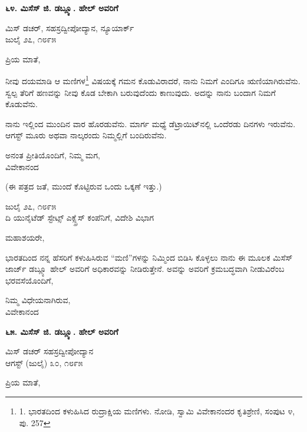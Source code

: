 \begin{center}
\textbf{೬೪. ಮಿಸೆಸ್ ಜಿ. ಡಬ್ಲ್ಯೂ. ಹೇಲ್ ಅವರಿಗೆ}
\end{center}

\begin{flushright}
 ಮಿಸ್ ಡಚರ್, ಸಹಸ್ರದ್ವೀಪೋದ್ಯಾನ, ನ್ಯೂಯಾರ್ಕ್\\ಜುಲೈ ೨೭, ೧೮೯೫
\end{flushright}

ಪ್ರಿಯ ಮಾತೆ,

ನೀವು ದಯಮಾಡಿ ಆ ಮಣಿಗಳ\footnote{1. ಭಾರತದಿಂದ ಕಳುಹಿಸಿದ ರುದ್ರಾಕ್ಷಿಯ ಮಣಿಗಳು. ನೋಡಿ, ಸ್ವಾಮಿ ವಿವೇಕಾನಂದರ ಕೃತಿಶ್ರೇಣಿ, ಸಂಪುಟ ೪, ಪು. 257} ವಿಷಯಕ್ಕೆ ಗಮನ ಕೊಡುವಿರಾದರೆ, ನಾನು ನಿಮಗೆ ಎಂದಿಗೂ ಋಣಿಯಾಗಿರುವೆನು. ಸ್ವಲ್ಪ ತೆರಿಗೆ ಹಣವನ್ನು ನೀವು ಕೊಡ ಬೇಕಾಗಿ ಬರುವುದೆಂದು ಕಾಣುವುದು. ಅದನ್ನು ನಾನು ಬಂದಾಗ ನಿಮಗೆ ಕೊಡುವೆನು.

ನಾನು ಇಲ್ಲಿಂದ ಮುಂದಿನ ವಾರ ಹೊರಡುವೆನು. ಮಾರ್ಗ ಮಧ್ಯೆ ಡೆಟ್ರಾಯಿಟ್‌ನಲ್ಲಿ ಒಂದೆರಡು ದಿನಗಳು ಇರುವೆನು. ಆಗಸ್ಟ್ ಮೂರು ಅಥವಾ ನಾಲ್ಕರಂದು ನಿಮ್ಮಲ್ಲಿಗೆ ಬಂದಿರುವೆನು.

\begin{flushright}
ಅನಂತ ಪ್ರೀತಿಯೊಂದಿಗೆ, ನಿಮ್ಮ ಮಗ,\\ವಿವೇಕಾನಂದ
\end{flushright}

(ಈ ಪತ್ರದ ಜತೆ, ಮುಂದೆ ಕೊಟ್ಟಿರುವ ಒಂದು ಒಕ್ಕಣೆ ಇತ್ತು.)

\begin{flushright}
ಜುಲೈ ೨೭, ೧೮೯೫\\ದಿ ಯುನೈಟೆಡ್ ಸ್ಟೇಟ್ಸ್ ಎಕ್ಸ್ಪ್ರೆಸ್ ಕಂಪೆನಿಗೆ, ವಿದೇಶಿ ವಿಭಾಗ
\end{flushright}

ಮಹಾಶಯರೇ,

ಭಾರತದಿಂದ ನನ್ನ ಹೆಸರಿಗೆ ಕಳುಹಿಸಿರುವ “ಮಣಿ”ಗಳನ್ನು ನಿಮ್ಮಿಂದ ಬಿಡಿಸಿ ಕೊಳ್ಳಲು ನಾನು ಈ ಮೂಲಕ ಮಿಸೆಸ್ ಜಾರ್ಜ್ ಡಬ್ಲ್ಯೂ ಹೇಲ್ ಅವರಿಗೆ ಅಧಿಕಾರವನ್ನು ನೀಡಿರುತ್ತೇನೆ. ಅವನ್ನು ಅವರಿಗೆ ಕ್ರಮಬದ್ಧವಾಗಿ ನೀಡುವಿರೆಂಬ ಭರವಸೆಯೊಂದಿಗೆ,

\begin{flushright}
ನಿಮ್ಮ ವಿಧೇಯನಾಗಿರುವ,\\ವಿವೇಕಾನಂದ
\end{flushright}

\begin{center}
\textbf{೬೫. ಮಿಸೆಸ್ ಜಿ. ಡಬ್ಲ್ಯೂ. ಹೇಲ್ ಅವರಿಗೆ}
\end{center}

\begin{flushright}
 ಮಿಸ್ ಡಚರ್ ಸಹಸ್ರದ್ವೀಪೋದ್ಯಾನ\\ಆಗಸ್ಟ್ (ಜುಲೈ) ೩೦, ೧೮೯೫
\end{flushright}

ಪ್ರಿಯ ಮಾತೆ,

